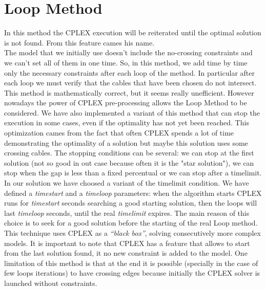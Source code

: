 \section{Loop Method}
In this method the \textsc{CPLEX} execution will be reiterated until the optimal solution is not found. From this feature cames his name. \\
The model that we initially use doesn't include the no-crossing constraints and we can't set all of them in one time. So, in this method, we add time by time only the necessary constraints after each loop of the method. In particular after each loop we must verify that the cables that have been chosen do not intersect.\\
This method is mathematically correct, but it seems really unefficient. However nowadays the power of \textsc{CPLEX} pre-processing allows the Loop Method to be considered. We have also implemented a variant of this method that can stop the execution in some cases, even if the optimality has not yet been reached. This optimization cames from the fact that often \textsc{CPLEX} spends a lot of time demonstrating the optimality of a solution but maybe this solution uses some crossing cables. The stopping conditions can be several: we can stop at the first solution (not so good in out case because often it is the "star solution"), we can stop when the gap is less than a fixed percentual or we can stop after a timelimit. \\
In our solution we have choosed a variant of the timelimit condition. We have defined a \textit{timestart} and a \textit{timeloop} parameters: when the algorithm starts \textsc{CPLEX} runs for \textit{timestart} seconds searching a good starting solution, then the loops will last \textit{timeloop} seconds, until the real \textit{timelimit} expires. The main reason of this choice is to seek for a good solution before the starting of the real Loop method. \\ 
This technique uses \textsc{CPLEX} as a \textit{“black box”}, solving consecutively more complex models. It is important to note that \textsc{CPLEX} has a feature that allows to start from the last solution found, it no new constraint is added to the model. One limitation of this method is that at the end it is possible (specially in the case of few loops iterations) to have crossing edges because initially the \textsc{CPLEX} solver is launched without constraints. 
